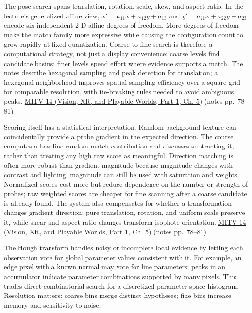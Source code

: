 The pose search spans translation, rotation, scale, skew, and aspect ratio. In the lecture's generalized affine view, \(x'=a_{11}x+a_{12}y+a_{13}\) and \(y'=a_{21}x+a_{22}y+a_{23}\) encode six independent 2-D affine degrees of freedom. More degrees of freedom make the match family more expressive while causing the configuration count to grow rapidly at fixed quantization. Coarse-to-fine search is therefore a computational strategy, not just a display convenience: coarse levels find candidate basins; finer levels spend effort where evidence supports a match. The notes describe hexagonal sampling and peak detection for translation; a hexagonal neighborhood improves spatial sampling efficiency over a square grid for comparable resolution, with tie-breaking rules needed to avoid ambiguous peaks. \href{../07-Vision-XR-and-Playable-Worlds-P01/main.pdf\#nameddest=04-visual-computing-ii-ch036-mitv-14---inspection-in-patquick-hough-transform-homography-position-determination-multi-scale}{MITV-14 (Vision, XR, and Playable Worlds, Part 1, Ch. 5)} (notes pp.~78--81)

Scoring itself has a statistical interpretation. Random background texture can coincidentally provide a probe gradient in the expected direction. The course computes a baseline random-match contribution and discusses subtracting it, rather than treating any high raw score as meaningful. Direction matching is often more robust than gradient magnitude because magnitude changes with contrast and lighting; magnitude can still be used with saturation and weights. Normalized scores cost more but reduce dependence on the number or strength of probes; raw weighted scores are cheaper for fine scanning after a coarse candidate is already found. The system also compensates for whether a transformation changes gradient direction: pure translation, rotation, and uniform scale preserve it, while shear and aspect-ratio changes transform isophote orientation. \href{../07-Vision-XR-and-Playable-Worlds-P01/main.pdf\#nameddest=04-visual-computing-ii-ch036-mitv-14---inspection-in-patquick-hough-transform-homography-position-determination-multi-scale}{MITV-14 (Vision, XR, and Playable Worlds, Part 1, Ch. 5)} (notes pp.~78--81)

The Hough transform handles noisy or incomplete local evidence by letting each observation vote for global parameter values consistent with it. For example, an edge pixel with a known normal may vote for line parameters; peaks in an accumulator indicate parameter combinations supported by many pixels. This trades direct combinatorial search for a discretized parameter-space histogram. Resolution matters: coarse bins merge distinct hypotheses; fine bins increase memory and sensitivity to noise.

